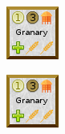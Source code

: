 \documentclass{article}
\begin{document}
\begin{figure}
\begin{subfigure}{}
    \includegraphics[scale=1]{../rules/png/doe_building_granary.png}
  \end{subfigure}
  \begin{subfigure}{}
    \includegraphics[scale=1]{../rules/png/doe_building_granary.png}
  \end{subfigure}
\end{figure}
\end{document}
